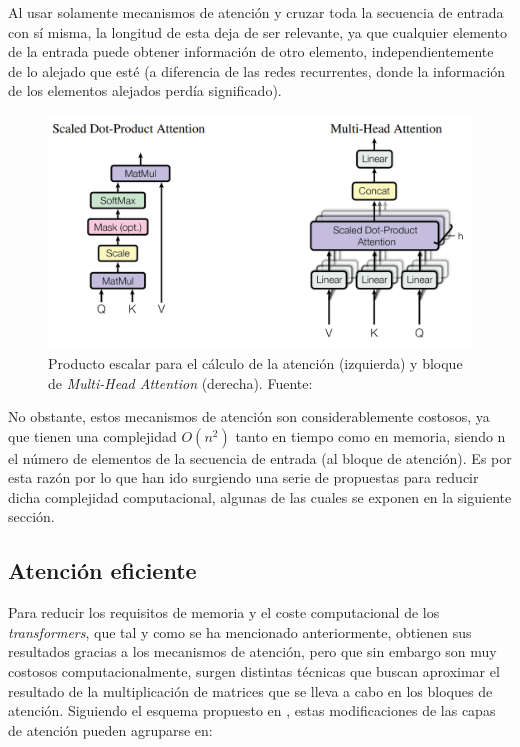 Al usar solamente mecanismos de atención y cruzar toda la secuencia de entrada con sí misma, la longitud de esta deja de ser relevante, ya que cualquier elemento de la entrada puede obtener información de otro elemento, independientemente de lo alejado que esté (a diferencia de las redes recurrentes, donde la información de los elementos alejados perdía significado).


\begin{figure}[H]
\centering
\includegraphics[width=0.65\linewidth]{imagenes/multi-head-attention.png} 
\captionsetup{width=.8\linewidth}
\caption{Producto escalar para el cálculo de la atención (izquierda) y bloque de \textit{Multi-Head Attention} (derecha). Fuente: \cite{NIPS2017_3f5ee243}}
\label{fig:multi-head-attention}
\end{figure}

No obstante, estos mecanismos de atención son considerablemente costosos, ya que tienen una complejidad $O(n^{2})$ tanto en tiempo como en memoria, siendo n el número de elementos de la secuencia de entrada (al bloque de atención). Es por esta razón por lo que han ido surgiendo una serie de propuestas para reducir dicha complejidad computacional, algunas de las cuales se exponen en la siguiente sección.



\subsection{Atención eficiente}\label{atencion-eficiente}

Para reducir los requisitos de memoria y el coste computacional de los \textit{transformers}, que tal y como se ha mencionado anteriormente, obtienen sus resultados gracias a los mecanismos de atención, pero que sin embargo son muy costosos computacionalmente, surgen distintas técnicas que buscan aproximar el resultado de la multiplicación de matrices que se lleva a cabo en los bloques de atención. Siguiendo el esquema propuesto en \cite{2020arXiv200906732T}, estas modificaciones de las capas de atención pueden agruparse en:


